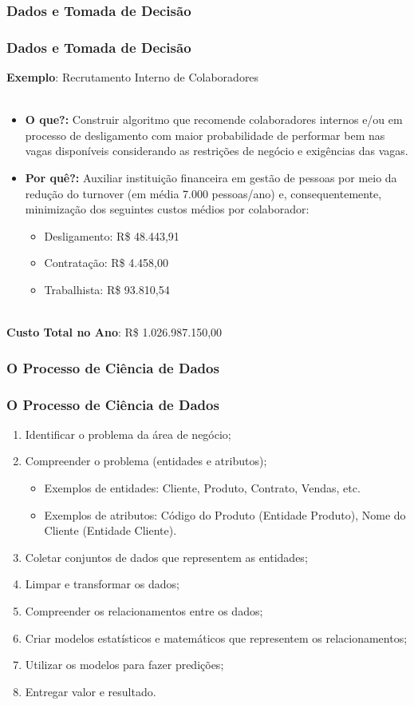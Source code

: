 \documentclass[pdf,9pt,xcolor=dvipsnames,hide notes]{beamer}\usepackage[]{graphicx}\usepackage[]{color}
\begin{document}
\subsubsection{Dados e Tomada de Decisão}
\begin{frame}\frametitle{Dados e Tomada de Decisão} 
\textbf{Exemplo}: Recrutamento Interno de Colaboradores \\~\\
  \begin{itemize}
    \item \textbf{O que?:} Construir algoritmo que recomende colaboradores internos e/ou em processo de desligamento com maior probabilidade de performar bem nas vagas disponíveis considerando as restrições de negócio e exigências das vagas.
    \item \textbf{Por quê?:} Auxiliar instituição financeira em gestão de pessoas por meio da redução do turnover (em média 7.000 pessoas/ano) e, consequentemente, minimização dos seguintes custos médios por colaborador:
    \begin{itemize}
      \item Desligamento: R\$ 48.443,91
      \item Contratação: R\$ 4.458,00
      \item Trabalhista: R\$ 93.810,54 \\~\\
    \end{itemize}
  \end{itemize}
\textbf{Custo Total no Ano}: R\$ 1.026.987.150,00
\end{frame}

\subsubsection{O Processo de Ciência de Dados}
\begin{frame}\frametitle{O Processo de Ciência de Dados} 
  \begin{enumerate}
    \item Identificar o problema da área de negócio;
    \item Compreender o problema (entidades e atributos);
    \begin{itemize} 
        \item Exemplos de entidades: Cliente, Produto, Contrato, Vendas, etc.
        \item Exemplos de atributos: Código do Produto (Entidade Produto), Nome do Cliente (Entidade Cliente).
     \end{itemize} 
    \item Coletar conjuntos de dados que representem as entidades;
    \item Limpar e transformar os dados;
    \item Compreender os relacionamentos entre os dados;
    \item Criar modelos estatísticos e matemáticos que representem os relacionamentos;
    \item Utilizar os modelos para fazer predições;
    \item Entregar valor e resultado.
  \end{enumerate}
\end{frame}
\end{document}
